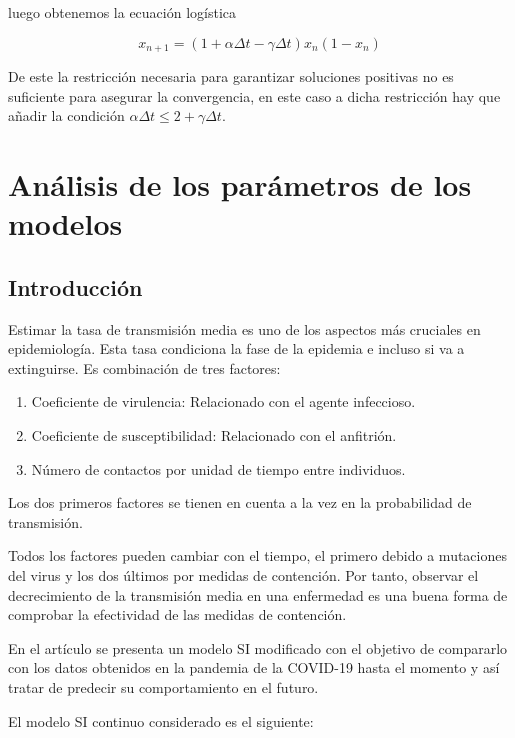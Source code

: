 luego obtenemos la ecuación logística

$$x_{n+1} = (1+\alpha \Delta t - \gamma \Delta t)x_n(1-x_n)$$

De este la restricción necesaria para garantizar soluciones positivas no es suficiente para asegurar la convergencia, en este caso a dicha restricción hay que añadir la condición $\alpha \Delta t \leq 2+\gamma \Delta t$.


 







\section{Análisis de los parámetros de los modelos}

\subsection{Introducción}

Estimar la tasa de transmisión media es uno de los aspectos más cruciales en epidemiología. Esta tasa condiciona la fase de la epidemia e incluso si va a extinguirse. Es combinación de tres factores:

\begin{enumerate}
\item Coeficiente de virulencia: Relacionado con el agente infeccioso.
\item Coeficiente de susceptibilidad: Relacionado con el anfitrión.
\item Número de contactos por unidad de tiempo entre individuos.
\end{enumerate}

Los dos primeros factores se tienen en cuenta a la vez en la probabilidad de transmisión.

Todos los factores pueden cambiar con el tiempo, el primero debido a mutaciones del virus y los dos últimos por medidas de contención. Por tanto, observar el decrecimiento de la transmisión media en una enfermedad es una buena forma de comprobar la efectividad de las medidas de contención.

En el artículo \cite{demongeotSIEpidemicModel} se presenta un modelo SI modificado con el objetivo de compararlo con los datos obtenidos en la pandemia de la COVID-19 hasta el momento y así tratar de predecir su comportamiento en el futuro.

El modelo SI continuo considerado es el siguiente:


